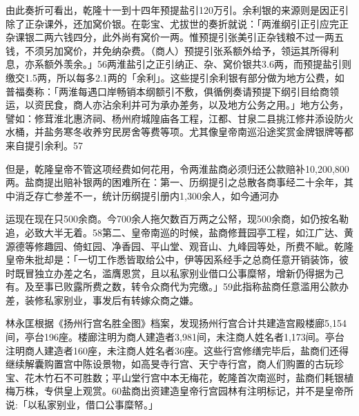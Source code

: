 由此奏折可看出，乾隆十一到十四年预提盐引120万引。余利银的来源则是因正引除了正杂课外，还加窝价银。在彰宝、尤拔世的奏折就说：「两淮纲引正引应完正杂课银二两六钱四分，此外尚有窝价一两。惟预提引张美引正杂钱粮不过一两五钱，不须另加窝价，并免纳杂费。（商人）预提引张系额外给予，领运其所得利息，亦系额外羡余。」56两淮盐引之正引纳正、杂、窝价银共3.6两，而预提盐引则缴交1.5两，所以每多2.1两的「余利」。这些提引余利银有部分做为地方公费，如普福奏称：「两淮每遇口岸畅销本纲额引不敷，俱循例奏请预提下纲引目给商领运，以资民食，商人亦沾余利并可为承办差务，以及地方公务之用。」地方公务，譬如：修茸淮北惠济祠、杨州府城隍庙各工程，江都、甘泉二县挑江修井添设防火水桶，并盐务寒冬收养穷民房舍等费等项。尤其像皇帝南巡沿途奖赏金牌银牌等都来自提引余利。57

但是，乾隆皇帝不管这项经费如何花用，令两淮盐商必须归还公款赔补10,200,800两。盐商提出赔补银两的困难所在：第一、历纲提引之总散各商事经二十余年，其中消乏存亡参差不一，统计历纲提引册内1,300余人，如今通河办

\vfill
\begin{BookNotes}
\end{BookNotes}

\noindent 运现在现在只500余商。今700余人拖欠数百万两之公帑，现500余商，如仍按名勒追，必致大半无着。58第二、皇帝南巡的时候，盐商修葺园亭工程，如江广达、黄源德等修趣园、倚虹园、净香园、平山堂、观音山、九峰园等处，所费不眦。乾隆皇帝朱批却是：「一切工作悉皆取给公中，伊等因系经手之总商任意开销装饰，彼时既冒独立办差之名，滥膺恩赏，且以私家别业借口公事糜帑，增新仍得据为己有。及至事已败露所费之数，转令众商代为完缴。」59此指称盐商任意滥用公款办差，装修私家别业，事发后有转嫁众商之嫌。

林永匡根据《扬州行宫名胜全图》档案，发现扬州行宫合计共建造宫殿楼廊5,154间，亭台196座。楼廊注明为商人建造者3,981间，未注商人姓名者1,173间。亭台注明商人建造者160座，未注商人姓名者36座。这些行宫修缮完毕后，盐商们还得继续解囊购置宫中陈设景物，如高旻寺行宫、天宁寺行宫，商人们购置的古玩珍宝、花木竹石不可胜数；平山堂行宫中本无梅花，乾隆首次南巡时，盐商们耗银植梅万株，专供皇上观赏。60盐商出资建造皇帝行宫园林有注明标记，并不是皇帝所说:「以私家别业，借口公事糜帑。」

